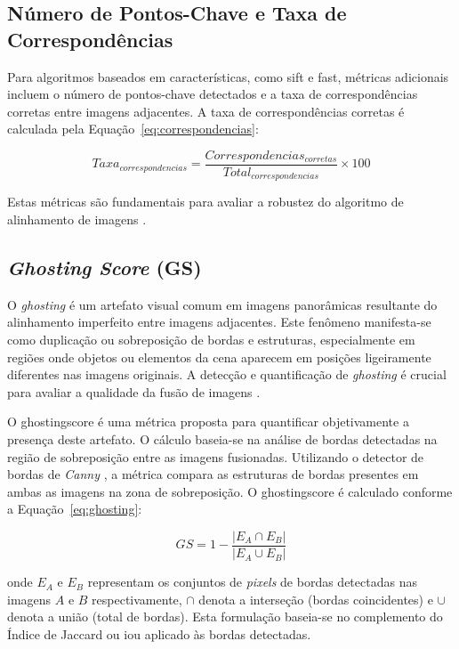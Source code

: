 \subsection*{Número de Pontos-Chave e Taxa de Correspondências}

Para algoritmos baseados em características, como \gls{sift} e \gls{fast}, métricas adicionais incluem o número de pontos-chave detectados e a taxa de correspondências corretas entre imagens adjacentes. A taxa de correspondências corretas é calculada pela Equação~\ref{eq:correspondencias}:

\begin{equation}
\label{eq:correspondencias}
Taxa_{correspondencias} = \frac{Correspondencias_{corretas}}{Total_{correspondencias}} \times 100
\end{equation}

Estas métricas são fundamentais para avaliar a robustez do algoritmo de alinhamento de imagens \cite{lowe2004distinctive}.

\subsection*{\textit{Ghosting Score} (GS)}

O \textit{ghosting} é um artefato visual comum em imagens panorâmicas resultante do alinhamento imperfeito entre imagens adjacentes. Este fenômeno manifesta-se como duplicação ou sobreposição de bordas e estruturas, especialmente em regiões onde objetos ou elementos da cena aparecem em posições ligeiramente diferentes nas imagens originais. A detecção e quantificação de \textit{ghosting} é crucial para avaliar a qualidade da fusão de imagens \cite{BrownLowe2007}.

O \gls{ghostingscore} é uma métrica proposta para quantificar objetivamente a presença deste artefato. O cálculo baseia-se na análise de bordas detectadas na região de sobreposição entre as imagens fusionadas. Utilizando o detector de bordas de \textit{Canny} \cite{gonzalez2008digital}, a métrica compara as estruturas de bordas presentes em ambas as imagens na zona de sobreposição. O \gls{ghostingscore} é calculado conforme a Equação~\ref{eq:ghosting}:

\begin{equation}
\label{eq:ghosting}
GS = 1 - \frac{|E_A \cap E_B|}{|E_A \cup E_B|}
\end{equation}

\noindent onde $E_A$ e $E_B$ representam os conjuntos de \textit{pixels} de bordas detectadas nas imagens $A$ e $B$ respectivamente, $\cap$ denota a interseção (bordas coincidentes) e $\cup$ denota a união (total de bordas). Esta formulação baseia-se no complemento do Índice de Jaccard ou \gls{iou} aplicado às bordas detectadas.

